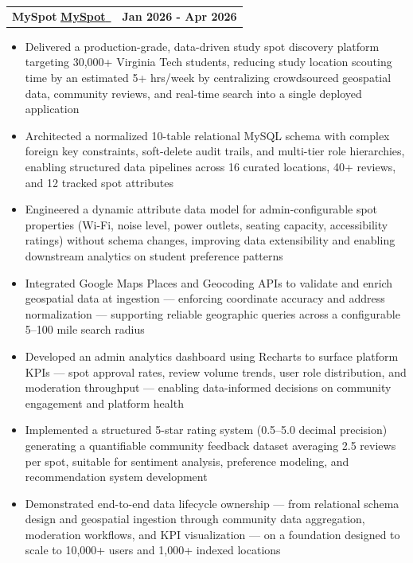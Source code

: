 \documentclass[letterpaper,11pt]{article}
\makeatletter
\newcommand{\resumeItem}[1]{
  \item\small{{#1 \vspace{-2pt}}}
}
\newcommand{\resumeProjectHeading}[4]{%
  \vspace{-2pt}\item
  \begin{tabular*}{1.001\textwidth}{l@{\extracolsep{\fill}}r}
    \small{%
      \ifthenelse{\equal{#1}{}}%
        {%
          \textbf{#2}%
          \ifthenelse{\equal{#3}{}}{}{ $|$ \emph{#3}}%
        }%
        {%
          \href{#1}{\underline{\textbf{#2}}~\faLink}%
          \ifthenelse{\equal{#3}{}}{}{ $|$ \emph{#3}}%
        }%
    } & \textbf{\small #4} \\
  \end{tabular*}\vspace{-7pt}
}
\newcommand{\resumeItemListStart}{\begin{itemize}}
\newcommand{\resumeItemListEnd}{\end{itemize}\vspace{-5pt}}
\makeatother
\begin{document}
        \resumeProjectHeading
            {https://my-spot-omega.vercel.app/}
            {MySpot}
            {React + Vite, TypeScript, Tailwind CSS, MySQL, Firebase (Storage), Google Maps API}
            {Jan 2026 - Apr 2026}
            \resumeItemListStart
                \resumeItem{Delivered a production-grade, data-driven study spot discovery platform targeting 30,000+ Virginia Tech students, reducing study location scouting time by an estimated 5+ hrs/week by centralizing crowdsourced geospatial data, community reviews, and real-time search into a single deployed application}
                \resumeItem{Architected a normalized 10-table relational MySQL schema with complex foreign key constraints, soft-delete audit trails, and multi-tier role hierarchies, enabling structured data pipelines across 16 curated locations, 40+ reviews, and 12 tracked spot attributes}
                \resumeItem{Engineered a dynamic attribute data model for admin-configurable spot properties (Wi-Fi, noise level, power outlets, seating capacity, accessibility ratings) without schema changes, improving data extensibility and enabling downstream analytics on student preference patterns}
                \resumeItem{Integrated Google Maps Places and Geocoding APIs to validate and enrich geospatial data at ingestion — enforcing coordinate accuracy and address normalization — supporting reliable geographic queries across a configurable 5–100 mile search radius}
                \resumeItem{Developed an admin analytics dashboard using Recharts to surface platform KPIs — spot approval rates, review volume trends, user role distribution, and moderation throughput — enabling data-informed decisions on community engagement and platform health}
                \resumeItem{Implemented a structured 5-star rating system (0.5–5.0 decimal precision) generating a quantifiable community feedback dataset averaging 2.5 reviews per spot, suitable for sentiment analysis, preference modeling, and recommendation system development}
                \resumeItem{Demonstrated end-to-end data lifecycle ownership — from relational schema design and geospatial ingestion through community data aggregation, moderation workflows, and KPI visualization — on a foundation designed to scale to 10,000+ users and 1,000+ indexed locations}
            \resumeItemListEnd
        \vspace{-10pt}
\end{document}
